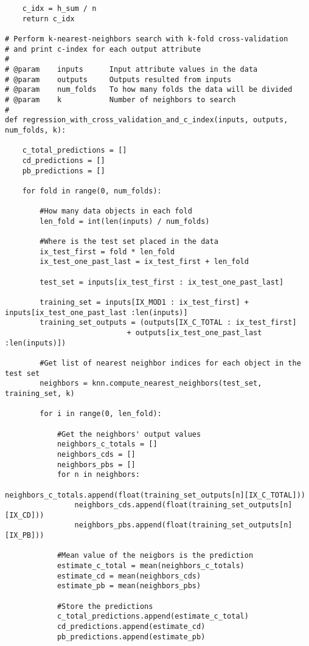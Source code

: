 \documentclass[a4paper]{article}
\begin{document}
\begin{lstlisting}
    c_idx = h_sum / n
    return c_idx

# Perform k-nearest-neighbors search with k-fold cross-validation
# and print c-index for each output attribute
#
# @param    inputs      Input attribute values in the data
# @param    outputs     Outputs resulted from inputs
# @param    num_folds   To how many folds the data will be divided
# @param    k           Number of neighbors to search
#
def regression_with_cross_validation_and_c_index(inputs, outputs, num_folds, k):
    
    c_total_predictions = []
    cd_predictions = []
    pb_predictions = []

    for fold in range(0, num_folds):

        #How many data objects in each fold
        len_fold = int(len(inputs) / num_folds)

        #Where is the test set placed in the data
        ix_test_first = fold * len_fold
        ix_test_one_past_last = ix_test_first + len_fold

        test_set = inputs[ix_test_first : ix_test_one_past_last]

        training_set = inputs[IX_MOD1 : ix_test_first] + inputs[ix_test_one_past_last :len(inputs)]
        training_set_outputs = (outputs[IX_C_TOTAL : ix_test_first] 
                            + outputs[ix_test_one_past_last :len(inputs)])

        #Get list of nearest neighbor indices for each object in the test set
        neighbors = knn.compute_nearest_neighbors(test_set, training_set, k)

        for i in range(0, len_fold):

            #Get the neighbors' output values 
            neighbors_c_totals = []
            neighbors_cds = []
            neighbors_pbs = []
            for n in neighbors:
                neighbors_c_totals.append(float(training_set_outputs[n][IX_C_TOTAL]))
                neighbors_cds.append(float(training_set_outputs[n][IX_CD]))
                neighbors_pbs.append(float(training_set_outputs[n][IX_PB]))

            #Mean value of the neigbors is the prediction
            estimate_c_total = mean(neighbors_c_totals)
            estimate_cd = mean(neighbors_cds)
            estimate_pb = mean(neighbors_pbs)
             
            #Store the predictions
            c_total_predictions.append(estimate_c_total)
            cd_predictions.append(estimate_cd)
            pb_predictions.append(estimate_pb)


\end{lstlisting}
\end{document}
